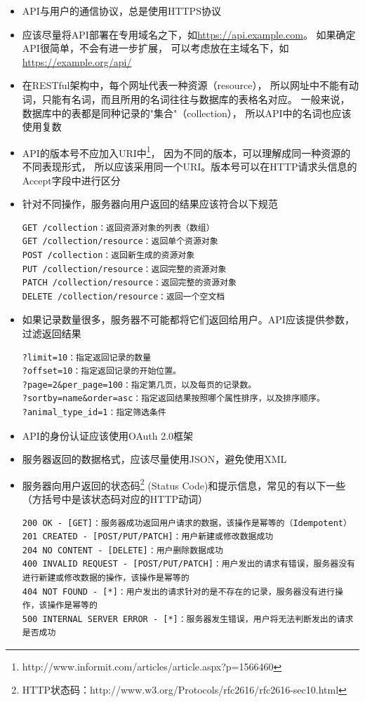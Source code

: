 \documentclass{book}
\begin{document}
\begin{itemize}
\item{API与用户的通信协议，总是使用HTTPS协议}
\item{应该尽量将API部署在专用域名之下，如\url{https://api.example.com}。
如果确定API很简单，不会有进一步扩展，
可以考虑放在主域名下，如\url{https://example.org/api/}}
\item{在RESTful架构中，每个网址代表一种资源（resource），
所以网址中不能有动词，只能有名词，而且所用的名词往往与数据库的表格名对应。
一般来说，数据库中的表都是同种记录的"集合"（collection），
所以API中的名词也应该使用复数}
\item{API的版本号不应加入URI中\footnote{http://www.informit.com/articles/article.aspx?p=1566460}，
因为不同的版本，可以理解成同一种资源的不同表现形式，
所以应该采用同一个URI。版本号可以在HTTP请求头信息的Accept字段中进行区分}
\item{针对不同操作，服务器向用户返回的结果应该符合以下规范}
\begin{lstlisting}
GET /collection：返回资源对象的列表（数组）
GET /collection/resource：返回单个资源对象
POST /collection：返回新生成的资源对象
PUT /collection/resource：返回完整的资源对象
PATCH /collection/resource：返回完整的资源对象
DELETE /collection/resource：返回一个空文档
\end{lstlisting}
\item{如果记录数量很多，服务器不可能都将它们返回给用户。API应该提供参数，过滤返回结果}
\begin{lstlisting}
?limit=10：指定返回记录的数量
?offset=10：指定返回记录的开始位置。
?page=2&per_page=100：指定第几页，以及每页的记录数。
?sortby=name&order=asc：指定返回结果按照哪个属性排序，以及排序顺序。
?animal_type_id=1：指定筛选条件
\end{lstlisting}
\item{API的身份认证应该使用OAuth 2.0框架}
\item{服务器返回的数据格式，应该尽量使用JSON，避免使用XML}
\item{服务器向用户返回的状态码\footnote{HTTP状态码：http://www.w3.org/Protocols/rfc2616/rfc2616-sec10.html}
(Status Code)和提示信息，常见的有以下一些（方括号中是该状态码对应的HTTP动词）}

\begin{lstlisting}
200 OK - [GET]：服务器成功返回用户请求的数据，该操作是幂等的（Idempotent）
201 CREATED - [POST/PUT/PATCH]：用户新建或修改数据成功
204 NO CONTENT - [DELETE]：用户删除数据成功
400 INVALID REQUEST - [POST/PUT/PATCH]：用户发出的请求有错误，服务器没有进行新建或修改数据的操作，该操作是幂等的
404 NOT FOUND - [*]：用户发出的请求针对的是不存在的记录，服务器没有进行操作，该操作是幂等的
500 INTERNAL SERVER ERROR - [*]：服务器发生错误，用户将无法判断发出的请求是否成功
\end{lstlisting}
\end{itemize}
\end{document}
